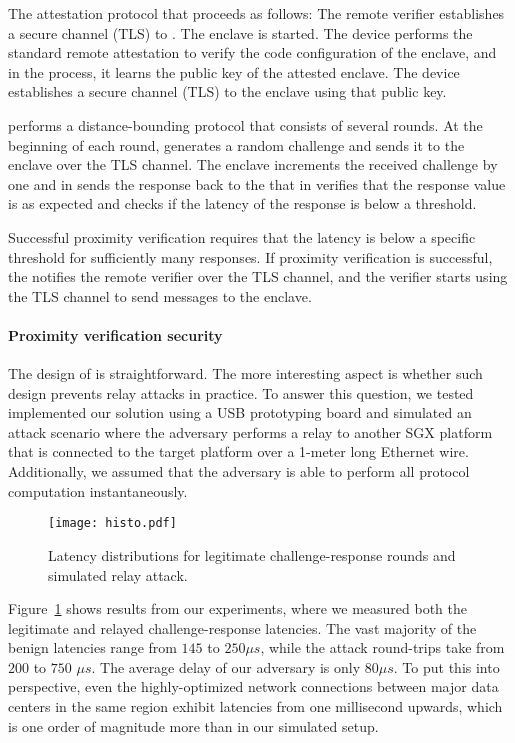 The \proximitee attestation protocol that proceeds as follows: \one The remote verifier establishes a secure channel (TLS) to \key. \two The enclave is started. \three The \key device performs the standard remote attestation to verify the code configuration of the enclave, and in the process, it learns the public key of the attested enclave. \four The \key device establishes a secure channel (TLS) to the enclave using that public key. 

\five \key performs a distance-bounding protocol that consists of several rounds. At the beginning of each round, \key generates a random challenge and sends it to the enclave over the TLS channel. \six The enclave increments the received challenge by one and in \seven sends the response back to the \key that in \eight verifies that the response value is as expected and checks if the latency of the response is below a threshold. 

\nine Successful proximity verification requires that the latency is below a specific threshold for sufficiently many responses. If proximity verification is successful, the \key notifies the remote verifier over the TLS channel, and the verifier starts using the \key TLS channel to send messages to the enclave.

\paragraph{Proximity verification security} The design of \proximitee is straightforward. The more interesting aspect is whether such design prevents relay attacks in practice. To answer this question, we tested implemented our solution using a USB prototyping board and simulated an attack scenario where the adversary performs a relay to another SGX platform that is connected to the target platform over a 1-meter long Ethernet wire. Additionally, we assumed that the adversary is able to perform all protocol computation instantaneously. 

\begin{figure}[t]
  \centering
    \texttt{[image: histo.pdf]} 
    \caption{Latency distributions for legitimate challenge-response rounds and simulated relay attack.}
    \label{graph:histogram}
\end{figure}

Figure~\ref{graph:histogram} shows results from our experiments, where we measured both the legitimate and relayed challenge-response latencies. The vast majority of the benign latencies range from $145$ to $250 \mu s$, while the attack round-trips take from $200$ to $750$ $\mu s$. The average delay of our adversary is only $80 \mu s$. To put this into perspective, even the highly-optimized network connections between major data centers in the same region exhibit latencies from one millisecond upwards, which is one order of magnitude more than in our simulated setup. 

